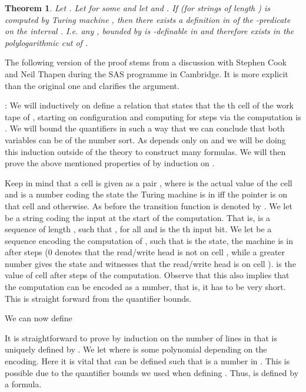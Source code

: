 \documentclass{LMCS}
\newtheorem{theorem}{Theorem}[section]
\newenvironment{proof}{\QuadSpace\par\noindent{\bf
Proof}:}{\EndProof\HalfSpace} \fi
\newcommand{\QuadSpace}{}\newcommand{\HalfSpace}{}\newcommand{\FullSpace}{}\newcommand{\EndProof}{ \hfill \vrule width 1ex height 1ex depth 0pt }
\newenvironment{proof}{

\smallskip
\noindent\emph{Proof.}}{\hfill
\bigskip
} \fi
\begin{document}
\begin{theorem}\label{Thm Nepomnjascij_formalized} Let .
  Let  for some  and let  and . If
   (for strings of length ) is computed by Turing machine , then there exists a 
  definition in  of the -predicate  on the interval . I.e. any ,
  bounded by  is -definable in  and therefore exists in the polylogarithmic cut of .
\end{theorem}
  The following version of the proof stems from a discussion with Stephen Cook and Neil Thapen during the SAS
  programme in Cambridge. It is more explicit than the original one and clarifies the argument.

\begin{proof}
  We will inductively on  define a  relation 
  that states that the th cell of the work tape of , starting on configuration  and computing
  for  steps via the computation  is . We will bound the
  quantifiers in such a way that we can conclude that both variables can be of the number sort. As  depends
  only on  and  we will be doing this induction outside of the theory to construct  many formulas. We
  will then prove the above mentioned properties of  by  induction
  on .

  Keep in mind that a cell is given as a pair , where  is the actual
  value of the cell and  is a number  coding the state the Turing machine is in iff the
  pointer is on that cell and  otherwise. As before the transition function is denoted by . We let
   be a string coding the input at the start of the computation. That is,  is a sequence of length
  , such that ,  for all  and  is the th input bit.
  We let  be a sequence encoding the computation of , such that
   is the state, the machine is in after  steps (0 denotes that the
  read/write head is not on cell , while a greater number gives the
  state and witnesses that the read/write head is on cell ). 
  is the value of cell  after  steps of the computation. Observe that this also implies that the
  computation can be encoded as a number, that is, it has to be very short. This is straight forward from the
  quantifier bounds.

  We can now define





  \noindent It is straightforward to prove by induction on the number of lines in  that 
  is uniquely defined by
  . We let 
  where  is some polynomial depending on the encoding. Here it is vital that  can be defined such that
   is a number in . This is possible due to the quantifier bounds we used when defining
  . Thus,  is defined by a  formula.


\end{proof}
\end{document}

